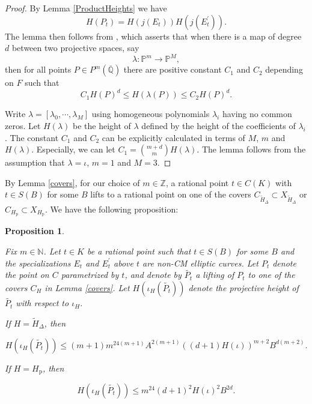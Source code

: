 \documentclass[12pt]{amsart}
\newtheorem{prop}[thm]{Proposition}
\theoremstyle{definition}
\theoremstyle{remark}
\numberwithin{equation}{section}
\newcommand{\N}{\mathbb{N}}
\newcommand{\Z}{\mathbb{Z}}
\newcommand{\Q}{\mathbb{Q}}
\begin{document}
\begin{proof}
By Lemma \ref{ProductHeights} we have
$$H(P_{t})=H(j(E_{t}))H(j(E_{t}^{\prime})).$$
The lemma then follows from \cite[VIII, Theorem 5.6]{Sil09}
, which asserts that when there is a map of degree $d$ between two projective spaces, say 
$$\lambda: \mathbb{P}^{m} \to \mathbb{P}^{M},$$
then for all points $P \in P^{m}(\overline{\Q})$
there are positive constant $C_{1}$ and $C_{2}$ depending on $F$ such that
$$C_{1}H(P)^{d} \le H(\lambda(P)) \le C_{2}H(P)^{d}.$$

Write $\lambda=[\lambda_{0}, \cdots, \lambda_{M}]$ using homogeneous polynomials $\lambda_{i}$ having no common zeros. Let $H(\lambda)$ be the height of $\lambda$ defined by the height of the coefficients of $\lambda_{i}$. The constant $C_{1}$ and $C_{2}$ can be explicitly calculated in terms of $M$, $m$ and $H(\lambda)$. Especially, we can let $C_{1}= \binom{m+d}{m} H(\lambda).$ The lemma follows from the assumption that $\lambda=\iota$, $m=1$ and $M=3$.
 
\end{proof}



\vspace{1em}
 By Lemma \ref{covers}, for our choice of $m \in \Z $, a rational point $t \in C(K)$ with $t \in S(B)$ for some $B$ lifts to a rational point on one of the covers $C_{\tilde{H}_{\Delta}} \subset X_{\tilde{H}_{\Delta}}$ or $C_{H_{\operatorname{p}}} \subset X_{H_{\operatorname{p}}}$. We have the following proposition:

\begin{prop}\label{change of heights}

Fix $m \in \N$. Let $t \in K$ be a rational point such that $t \in S(B)$ for some $B$ and the specializations $E_t$ and $E^{\prime}_t$ above $t$ are non-CM elliptic curves. Let $P_{t}$ denote the point on $C$ parametrized by $t$, and denote by $\tilde{P_{t}}$ a lifting of $P_{t}$ to one of the covers $C_H$ in Lemma \ref{covers}. Let $H(\iota_{H}(\tilde{P_{t}}))$ denote the projective height of $\tilde{P_{t}}$ with respect to $\iota_{H}$. 

If  $H=\tilde{H}_{\Delta}$, then 

 $$H(\iota_{H}(\tilde{P_{t}})) \le (m+1)m^{24(m+1)}A^{2(m+1)}((d+1)H(\iota))^{m+2}B^{d(m+2)} .$$	

 
 If $H=H_{\operatorname{p}}$, then 

 $$H(\iota_{H}(\tilde{P_{t}})) \le  m^{24}(d+1)^{2}H(\iota)^{2}B^{2d} .$$	



\end{prop}
\end{document}
